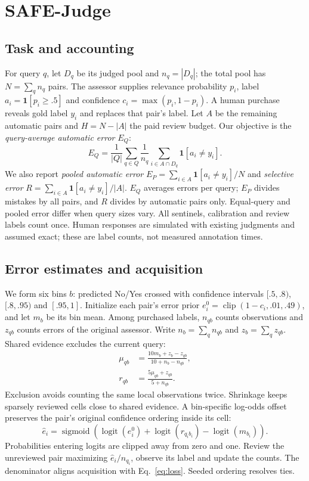 \documentclass[sigconf,nonacm]{acmart}
\newcommand{\sigmoid}{\operatorname{sigmoid}}
\newcommand{\logit}{\operatorname{logit}}
\begin{document}
\section{SAFE-Judge}
\subsection{Task and accounting}
For query $q$, let $D_q$ be its judged pool and $n_q=|D_q|$; the total pool has
$N=\sum_q n_q$ pairs. The assessor supplies relevance probability $p_i$, label
$a_i=\mathbf{1}[p_i\ge .5]$ and confidence $c_i=\max(p_i,1-p_i)$. A human purchase
reveals gold label $y_i$ and replaces that pair's label. Let $A$ be the remaining
automatic pairs and $H=N-|A|$ the paid review budget. Our objective is the
\emph{query-average automatic error} $E_Q$:
\begin{equation}
 E_Q=\frac{1}{|Q|}\sum_{q\in Q}\frac{1}{n_q}
       \sum_{i\in A\cap D_q}\mathbf{1}[a_i\ne y_i].
 \label{eq:loss}
\end{equation}
We also report \emph{pooled automatic error}
$E_P=\sum_{i\in A}\mathbf{1}[a_i\ne y_i]/N$ and \emph{selective error}
$R=\sum_{i\in A}\mathbf{1}[a_i\ne y_i]/|A|$. $E_Q$ averages errors per query;
$E_P$ divides mistakes by all pairs, and $R$ divides by automatic pairs only.
Equal-query and pooled error differ when query sizes vary.
All sentinels, calibration and review
labels count once. Human responses are simulated with existing judgments and
assumed exact; these are label counts, not measured annotation times.

\subsection{Error estimates and acquisition}
We form six bins $b$: predicted No/Yes crossed with confidence intervals
$[.5,.8)$, $[.8,.95)$ and $[.95,1]$. Initialize each pair's error prior
$e_i^0=\operatorname{clip}(1-c_i,.01,.49)$, and let $m_b$ be its bin mean.
Among purchased labels, $n_{qb}$ counts observations and $z_{qb}$ counts errors
of the original assessor. Write $n_b=\sum_q n_{qb}$ and $z_b=\sum_q z_{qb}$.
Shared evidence excludes the current query:
\begin{align}
 \mu_{qb}&=\frac{10m_b+z_b-z_{qb}}{10+n_b-n_{qb}},\label{eq:shared}\\
 r_{qb}&=\frac{5\mu_{qb}+z_{qb}}{5+n_{qb}}.\label{eq:local}
\end{align}
Exclusion avoids counting the same local observations twice. Shrinkage keeps
sparsely reviewed cells close to shared evidence. A bin-specific log-odds offset
preserves the pair's original confidence ordering inside its cell:
\begin{equation}
 \widehat e_i=\sigmoid\!\left(\logit(e_i^0)+
               \logit(r_{q_i b_i})-\logit(m_{b_i})\right).
 \label{eq:error}
\end{equation}
Probabilities entering logits are clipped away from zero and one. Review the
unreviewed pair maximizing $\widehat e_i/n_{q_i}$, observe its label and update
the counts. The denominator aligns acquisition with Eq.~\eqref{eq:loss}.
Seeded ordering resolves ties.
\end{document}
